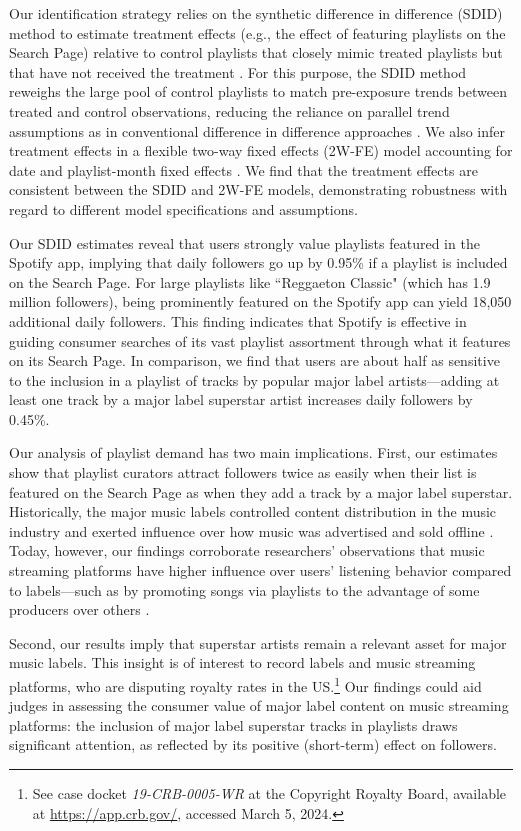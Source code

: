 \documentclass[12pt, a4paper, leqno]{article}
\begin{document}
Our identification strategy relies on the synthetic difference in difference (SDID) method to estimate treatment effects (e.g., the effect of featuring playlists on the Search Page) relative to control playlists that closely mimic treated playlists but that have not received the treatment \citep[e.g.,][]{berman2022value}. For this purpose, the SDID method reweighs the large pool of control playlists to match pre-exposure trends between treated and control observations, reducing the reliance on parallel trend assumptions as in conventional difference in difference approaches \citep{SDiD_AER_Arkhangelsky_21}. We also infer treatment effects in a flexible two-way fixed effects (2W-FE) model accounting for date and playlist-month fixed effects \citep[e.g.,][]{shapiro_hitsch_tuchman_2021}. We find that the treatment effects are consistent between the SDID and 2W-FE models, demonstrating robustness with regard to different model specifications and assumptions. 

Our SDID estimates reveal that users strongly value playlists featured in the Spotify app, implying that daily followers go up by 0.95\% if a playlist is included on the Search Page. For large playlists like ``Reggaeton Classic" (which has 1.9 million followers), being prominently featured on the Spotify app can yield 18,050 additional daily followers. This finding indicates that Spotify is effective in guiding consumer searches of its vast playlist assortment through what it features on its Search Page. In comparison, we find that users are about half as sensitive to the inclusion in a playlist of tracks by popular major label artists---adding at least one track by a major label superstar artist increases daily followers by 0.45\%. 

Our analysis of playlist demand has two main implications. First, our estimates show that playlist curators attract followers twice as easily when their list is featured on the Search Page as when they add a track by a major label superstar. 
Historically, the major music labels controlled content distribution in the music industry and exerted influence over how music was advertised and sold offline \citep[][]{prey_2020,du_gay_and_negus_1994}. Today, however, our findings corroborate researchers’ observations that music streaming platforms have higher influence over users’ listening behavior compared to labels---such as by promoting songs via playlists to the advantage of some producers over others \citep[][]{Aguiar_Waldfogel_power}. 

Second, our results imply that superstar artists remain a relevant asset for major music labels. This insight is of interest to record labels and music streaming platforms, who are disputing royalty rates in the US.\footnote{See case docket \textit{19-CRB-0005-WR} at the Copyright Royalty Board, available at \href{https://app.crb.gov/case/detail/19-CRB-0005-WR\%20\%282021-2025\%29}{https://app.crb.gov/}, accessed March 5, 2024.} Our findings could aid judges in assessing the consumer value of major label content on music streaming platforms: the inclusion of major label superstar tracks in playlists draws significant attention, as reflected by its positive (short-term) effect on followers. 
\end{document}
